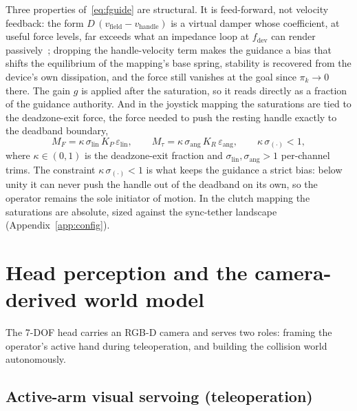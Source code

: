 \documentclass[12pt,a4paper,twoside,openright]{report}
\begin{document}
Three properties of~\eqref{eq:fguide} are structural. It is feed-forward, not velocity feedback: the form $D\,(v_{\text{field}} - v_{\text{handle}})$ is a virtual damper whose coefficient, at useful force levels, far exceeds what an impedance loop at $f_{\text{dev}}$ can render passively~\cite{colgate1994factors}; dropping the handle-velocity term makes the guidance a bias that shifts the equilibrium of the mapping's base spring, stability is recovered from the device's own dissipation, and the force still vanishes at the goal since $\pi_k \to 0$ there. The gain $g$ is applied after the saturation, so it reads directly as a fraction of the guidance authority. And in the joystick mapping the saturations are tied to the deadzone-exit force, the force needed to push the resting handle exactly to the deadband boundary,
\begin{equation}
M_F = \kappa\,\sigma_{\text{lin}}\, K_P\, \varepsilon_{\text{lin}},
\qquad
M_\tau = \kappa\,\sigma_{\text{ang}}\, K_R\, \varepsilon_{\text{ang}},
\qquad
\kappa\,\sigma_{(\cdot)} < 1,
\label{eq:kappacal}
\end{equation}
where $\kappa \in (0,1)$ is the deadzone-exit fraction and $\sigma_{\text{lin}}, \sigma_{\text{ang}} > 1$ per-channel trims. The constraint $\kappa\,\sigma_{(\cdot)} < 1$ is what keeps the guidance a strict bias: below unity it can never push the handle out of the deadband on its own, so the operator remains the sole initiator of motion. In the clutch mapping the saturations are absolute, sized against the sync-tether landscape (Appendix~\ref{app:config}).

\section{Head perception and the camera-derived world model}
\label{sec:head}

The 7-DOF head carries an RGB-D camera and serves two roles: framing the operator's active hand during teleoperation, and building the collision world autonomously.

\subsection{Active-arm visual servoing (teleoperation)}
\label{sec:headtrack}
\end{document}
